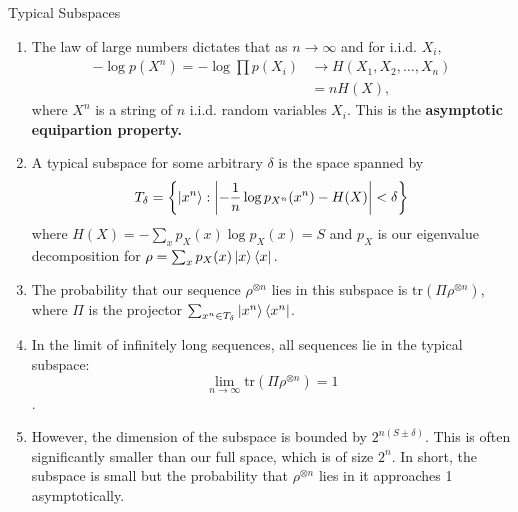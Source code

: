 \documentclass{beamer}
\begin{document}
\begin{frame}[allowframebreaks]{Typical Subspaces}
\begin{enumerate}
    \item The law of large numbers dictates that as $n\to\infty$ and for i.i.d. $X_i,$
    \begin{align*}-\log p(X^n)= -\log\prod p(X_i)&\to H(X_1,X_2,\dots,X_n) \\&= n H(X),\end{align*} where $X^n$ is a string of $n$ i.i.d. random variables $X_i.$ This is the \textbf{asymptotic equipartion property.}
    
    \item A typical subspace for some arbitrary $\delta$ is the space spanned by
    \[T_\delta =\left\{\ket{x^n}:\left|-\frac{1}{n}\log p_{X^n}(x^n)-H(X)\right|<\delta\right\}\] where $H(X)=-\sum_{x}p_X(x)\log p_X(x)=S$ and $p_X$ is our eigenvalue decomposition for $\rho=\sum_{x}p_X(x)\ket{x}\bra{x}.$ %

    \framebreak
    \item The probability that our sequence $\rho^{\otimes n}$ lies in this subspace is $\mathrm{tr}(\Pi\rho^{\otimes n})$, where $\Pi$ is the projector $\sum_{x^n\in T_\delta} \ket{x^n}\bra{x^n}$. 
    
    \item In the limit of infinitely long sequences, all sequences lie in the typical subspace:
    \[\lim_{n\to\infty}\mathrm{tr}(\Pi \rho^{\otimes n})=1\]. 
    
    \item However, the dimension of the subspace is bounded by $2^{n(S\pm\delta)}$. This is often significantly smaller than our full space, which is of size $2^n.$ In short, the subspace is small but the probability that $\rho^{\otimes n}$ lies in it approaches 1 asymptotically.
    \end{enumerate}
\end{frame}
\end{document}
